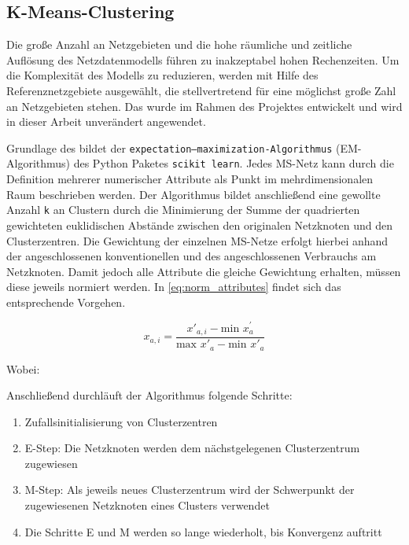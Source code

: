 \subsection{K-Means-Clustering}

Die große Anzahl an Netzgebieten und die hohe räumliche und zeitliche Auflösung des Netzdatenmodells führen zu inakzeptabel hohen Rechenzeiten.
Um die Komplexität des Modells zu reduzieren, werden mit Hilfe des \kmeans Referenznetzgebiete ausgewählt, die stellvertretend für eine möglichst große Zahl an Netzgebieten stehen.
Das \kmeans wurde im Rahmen des \openego Projektes entwickelt und wird in dieser Arbeit unverändert angewendet. \cite{Mueller2019}\medskip

Grundlage des \kmeans bildet der \texttt{expectation–maximization-Algorithmus} (EM-Algorithmus) des Python Paketes \texttt{scikit learn}. \cite{scikit-learn2011}
Jedes \gls{MS}-Netz kann durch die Definition mehrerer numerischer Attribute als Punkt im mehrdimensionalen Raum beschrieben werden.
Der Algorithmus bildet anschließend eine gewollte Anzahl \texttt{k} an Clustern durch die Minimierung der Summe der quadrierten gewichteten euklidischen Abstände zwischen den originalen Netzknoten und den Clusterzentren.
Die Gewichtung der einzelnen \gls{MS}-Netze erfolgt hierbei anhand der angeschlossenen konventionellen und des angeschlossenen Verbrauchs am Netzknoten.
Damit jedoch alle Attribute die gleiche Gewichtung erhalten, müssen diese jeweils normiert werden.
In \autoref{eq:norm_attributes} findet sich das entsprechende Vorgehen.

\begin{equation}
	x_{a, i} = \frac{x'_{a, i} - \text{min~} x^{'}_a}{\text{max~} x'_a - \text{min~} x'_a}
	\label{eq:norm_attributes}
\end{equation}

\noindent Wobei:


\noindent Anschließend durchläuft der Algorithmus folgende Schritte:

\begin{enumerate}
	\item Zufallsinitialisierung von Clusterzentren
	\item E-Step: Die Netzknoten werden dem nächstgelegenen Clusterzentrum zugewiesen
	\item M-Step: Als jeweils neues Clusterzentrum wird der Schwerpunkt der zugewiesenen Netzknoten eines Clusters verwendet
	\item Die Schritte E und M werden so lange wiederholt, bis Konvergenz auftritt
\end{enumerate}


